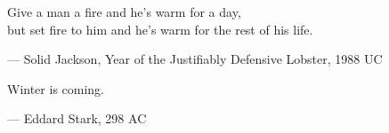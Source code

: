 \begin{flushright}
\begin{hangleftquote}{\QENOpen}{\QENClose}
Give a man a fire and he's warm for a day,\\
but set fire to him and he's warm for the rest of his life.
\end{hangleftquote}
\par\smallskip
\normalfont — Solid Jackson, Year of the Justifiably Defensive Lobster, 1988 UC
\end{flushright}
\vspace{2em}
\begin{flushright}
\begin{hangleftquote}{\QENOpen}{\QENClose}
Winter is coming.
\end{hangleftquote}
\par\smallskip
\normalfont — Eddard Stark, 298 AC
\end{flushright}
